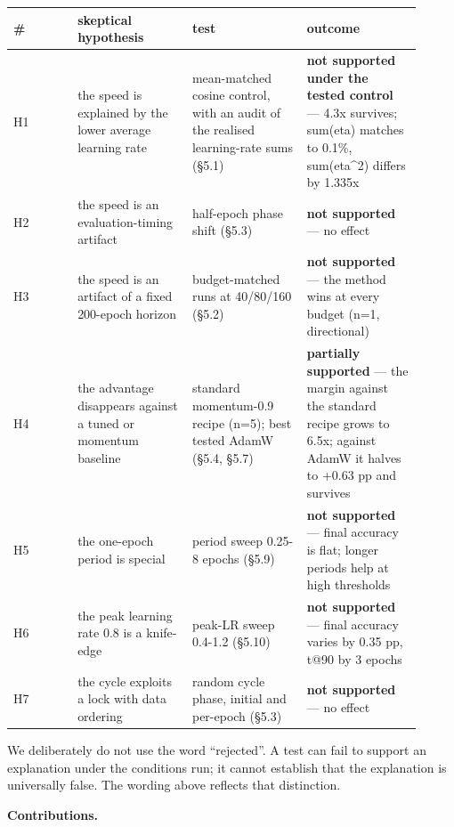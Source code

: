 \documentclass[11pt,a4paper]{article}
\begin{document}
\begin{center}
\small
\begin{tabular}{@{}>{\raggedright\arraybackslash}p{0.140\linewidth}>{\raggedright\arraybackslash}p{0.257\linewidth}>{\raggedright\arraybackslash}p{0.257\linewidth}>{\raggedright\arraybackslash}p{0.257\linewidth}@{}}
\toprule
\textbf{\#} & \textbf{skeptical hypothesis} & \textbf{test} & \textbf{outcome} \\
\midrule
H1 & the speed is explained by the lower average learning rate & mean-matched cosine control, with an audit of the realised learning-rate sums (\S{}5.1) & \textbf{not supported under the tested control} --- 4.3x survives; sum(eta) matches to 0.1\%, sum(eta\textasciicircum{}2) differs by 1.335x \\
H2 & the speed is an evaluation-timing artifact & half-epoch phase shift (\S{}5.3) & \textbf{not supported} --- no effect \\
H3 & the speed is an artifact of a fixed 200-epoch horizon & budget-matched runs at 40/80/160 (\S{}5.2) & \textbf{not supported} --- the method wins at every budget (n=1, directional) \\
H4 & the advantage disappears against a tuned or momentum baseline & standard momentum-0.9 recipe (n=5); best tested AdamW (\S{}5.4, \S{}5.7) & \textbf{partially supported} --- the margin against the standard recipe grows to 6.5x; against AdamW it halves to +0.63 pp and survives \\
H5 & the one-epoch period is special & period sweep 0.25-8 epochs (\S{}5.9) & \textbf{not supported} --- final accuracy is flat; longer periods help at high thresholds \\
H6 & the peak learning rate 0.8 is a knife-edge & peak-LR sweep 0.4-1.2 (\S{}5.10) & \textbf{not supported} --- final accuracy varies by 0.35 pp, t@90 by 3 epochs \\
H7 & the cycle exploits a lock with data ordering & random cycle phase, initial and per-epoch (\S{}5.3) & \textbf{not supported} --- no effect \\
\bottomrule
\end{tabular}
\end{center}

We deliberately do not use the word ``rejected''. A test can fail to support an explanation under the conditions run; it cannot establish that the explanation is universally false. The wording above reflects that distinction.

\textbf{Contributions.}
\end{document}
